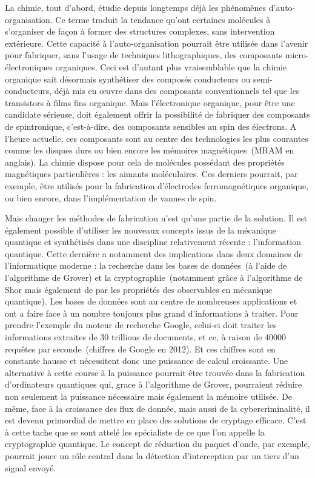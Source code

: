 La chimie, tout d'abord, étudie depuis longtemps déjà les phénomènes d'auto-organisation. Ce terme traduit la tendance qu'ont certaines molécules à s'organiser de façon à former des structures complexes, sans intervention extérieure. Cette capacité à l'auto-organisation pourrait être utilisée dans l'avenir pour fabriquer, sans l'usage de techniques lithographiques, des composants micro-électroniques organiques. Ceci est d'autant plus vraisemblable que la chimie organique sait désormais synthétiser des composés conducteurs ou semi-conducteurs, déjà mis en œuvre dans des composants conventionnels tel que les transistors à films fins organique. Mais l'électronique organique, pour être une candidate sérieuse, doit également offrir la possibilité de fabriquer des composants de spintronique, c'est-à-dire, des composants sensibles au spin des électrons. A l'heure actuelle, ces composants sont au centre des technologies les plus courantes comme les disques durs ou bien encore les mémoires magnétiques~(MRAM en anglais). La chimie dispose pour cela de molécules possédant des propriétés magnétiques particulières : les aimants moléculaires. Ces derniers pourrait, par exemple, \^etre utilisés pour la fabrication d'électrodes ferromagnétiques organique, ou bien encore, dans l'implémentation de vannes de spin.

Mais changer les méthodes de fabrication n'est qu'une partie de la solution. Il est également possible d'utiliser les nouveaux concepts issus de la mécanique quantique et synthétisés dans une discipline relativement récente : l'information quantique. Cette dernière a notamment des implications dans deux domaines de l'informatique moderne : la recherche dans les bases de données~(à l'aide de l’algorithme de Grover) et la cryptographie~(notamment grâce à l'algorithme de Shor mais également de par les propriétés des observables en mécanique quantique). Les bases de données sont au centre de nombreuses applications et ont a faire face à un nombre toujours plus grand d'informations à traiter. Pour prendre l'exemple du moteur de recherche Google, celui-ci doit traiter les informations extraites de 30 trillions de documents, et ce, à raison de 40000 requêtes par seconde~(chiffres de Google en 2012). Et ces chiffres sont en constante hausse et nécessitent donc une puissance de calcul croissante. Une alternative à cette course à la puissance pourrait être trouvée dans la fabrication d'ordinateurs quantiques qui, grace à l'algorithme de Grover, pourraient réduire non seulement la puissance nécessaire mais également la mémoire utilisée. De m\^eme, face à la croissance des flux de donnée, mais aussi de la cybercriminalité, il est devenu primordial de mettre en place des solutions de cryptage efficace. C'est à cette tache que se sont attelé les spécialiste de ce que l’on appelle la cryptographie quantique. Le concept de réduction du paquet d'onde, par exemple, pourrait jouer un rôle central dans la détection d'interception par un tiers d'un signal envoyé.

